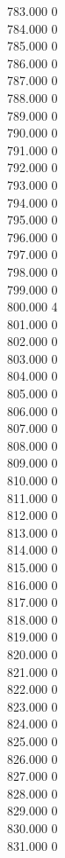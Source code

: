 { 783.000	0 \\
 784.000	0 \\
 785.000	0 \\
 786.000	0 \\
 787.000	0 \\
 788.000	0 \\
 789.000	0 \\
 790.000	0 \\
 791.000	0 \\
 792.000	0 \\
 793.000	0 \\
 794.000	0 \\
 795.000	0 \\
 796.000	0 \\
 797.000	0 \\
 798.000	0 \\
 799.000	0 \\
 800.000	4 \\
 801.000	0 \\
 802.000	0 \\
 803.000	0 \\
 804.000	0 \\
 805.000	0 \\
 806.000	0 \\
 807.000	0 \\
 808.000	0 \\
 809.000	0 \\
 810.000	0 \\
 811.000	0 \\
 812.000	0 \\
 813.000	0 \\
 814.000	0 \\
 815.000	0 \\
 816.000	0 \\
 817.000	0 \\
 818.000	0 \\
 819.000	0 \\
 820.000	0 \\
 821.000	0 \\
 822.000	0 \\
 823.000	0 \\
 824.000	0 \\
 825.000	0 \\
 826.000	0 \\
 827.000	0 \\
 828.000	0 \\
 829.000	0 \\
 830.000	0 \\
 831.000	0 \\
}
